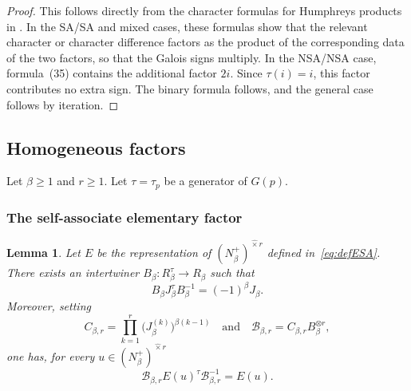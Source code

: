 \documentclass[reqno]{amsart}
\newtheorem{lemma}[theorem]{Lemma}     %
\theoremstyle{definition}
\begin{document}
\begin{proof}
This follows directly from the character formulas for Humphreys products
in \cite[Section~5, formulas~(27)--(35)]{BrNaMZ}. In the SA/SA and mixed
cases, these formulas show that the relevant character or character
difference factors as the product of the corresponding data of the two
factors, so that the Galois signs multiply. In the NSA/NSA case,
formula~(35) contains the additional factor $2i$. Since $\tau(i)=i$,
this factor contributes no extra sign. The binary formula follows, and
the general case follows by iteration.
\end{proof}

\subsection{Homogeneous factors}

Let $\beta\geq 1$ and $r\geq 1$. Let $\tau=\tau_p$ be a generator of
$G(p)$. 

\subsubsection{The self-associate elementary factor}

\begin{lemma}
\label{lem:galois-E}
Let  $E$ be the representation of $(N_\beta^+)^{\widehat{\times} r}$
defined in~\eqref{eq:defESA}. There exists an intertwiner $
B_\beta:R_\beta^\tau\longrightarrow R_\beta $
such that
\begin{equation}
\label{eq:conjassD}
B_\beta J_\beta^\tau B_\beta^{-1}
=
(-1)^\beta J_\beta.
\end{equation}
Moreover, setting
\[
C_{\beta,r}
=
\prod_{k=1}^r
\bigl(J_\beta^{(k)}\bigr)^{\beta(k-1)}
\quad\text{and}\quad
\mathcal B_{\beta,r}
=
C_{\beta,r}B_\beta^{\otimes r},
\]
one has, for every $u\in(N_\beta^+)^{\widehat{\times} r}$
\begin{equation}
\label{eq:interbase}
\mathcal B_{\beta,r}E(u)^\tau
\mathcal B_{\beta,r}^{-1}
=
E(u).
\end{equation}
\end{lemma}
\end{document}
